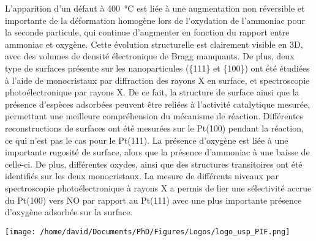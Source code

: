 \begin{mdframed}[linecolor=Prune,linewidth=1]
\begin{multicols}{2}
L'apparition d'un défaut à \qty{400}{\degreeCelsius} est liée à une augmentation non réversible et importante de la déformation homogène lors de l'oxydation de l'ammoniac pour la seconde particule, qui continue d'augmenter en fonction du rapport entre ammoniac et oxygène.
Cette évolution structurelle est clairement visible en 3D, avec des volumes de densité électronique de Bragg manquants.
De plus, deux type de surfaces présente sur les nanoparticules (\{111\} et \{100\}) ont été étudiées à l'aide de monocristaux par diffraction des rayons X en surface, et spectroscopie photoélectronique par rayons X.
De ce fait, la structure de surface ainsi que la présence d'espèces adsorbées peuvent être reliées à l'activité catalytique mesurée, permettant une meilleure compréhension du mécanisme de réaction.
Différentes reconstructions de surfaces ont été mesurées sur le Pt(100) pendant la réaction, ce qui n'est pas le cas pour le Pt(111).
La présence d'oxygène est liée à une importante rugosité de surface, alors que la présence d'ammoniac à une baisse de celle-ci.
De plus, différentes oxydes, ainsi que des structures transitoires ont été identifiés sur les deux monocristaux.
La mesure de différents niveaux par spectroscopie photoélectronique à rayons X a permis de lier une sélectivité accrue du Pt(100) vers NO par rapport au Pt(111) avec une plus importante présence d'oxygène adsorbée sur la surface.
\end{multicols}

\end{mdframed}

\newpage
\thispagestyle{empty}

\lhead{}
\rhead{}
\rfoot{}
\cfoot{}
\lfoot{}

\noindent
\texttt{[image: /home/david/Documents/PhD/Figures/Logos/logo\_usp\_PIF.png]}
\vspace{0.5cm}

\small

